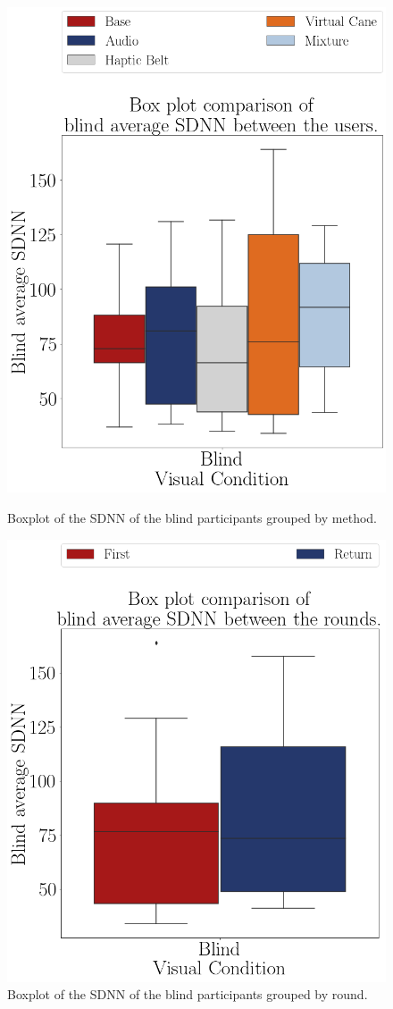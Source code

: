 \begin{figure}[!htb]
    \centering
    \begin{minipage}{0.45\textwidth}
        \centering
        \includegraphics[width = 0.8\linewidth]{Resultados/ECG/Figuras/png/boxplot_ecg_sdnn_blind_scene.png}
        \caption{Boxplot of the SDNN of the blind participants grouped by method.}
        \label{fig:boxplot_ecg_sdnn_blind_scene}
    \end{minipage}
    \begin{minipage}{0.45\textwidth}
        \centering
        \includegraphics[width = 0.8\linewidth]{Resultados/ECG/Figuras/png/boxplot_ecg_sdnn_blind_rounds.png}
        \caption{Boxplot of the SDNN of the blind participants grouped by round.}
        \label{fig:boxplot_ecg_sdnn_blind_rounds}
    \end{minipage}
\end{figure}

